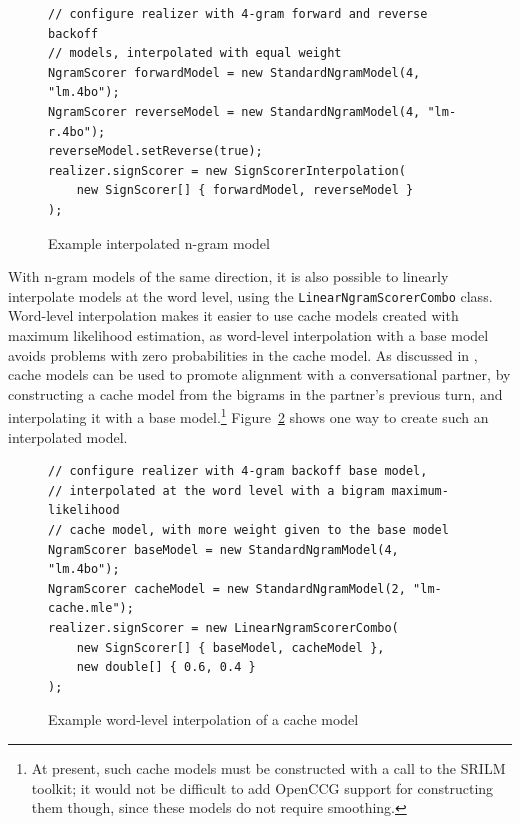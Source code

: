 \documentclass[11pt]{article}
\newcommand{\code}[1]{\texttt{#1}} %
\begin{document}
\begin{figure}%
\begin{center}
\begin{lstlisting}
// configure realizer with 4-gram forward and reverse backoff 
// models, interpolated with equal weight
NgramScorer forwardModel = new StandardNgramModel(4, "lm.4bo"); 
NgramScorer reverseModel = new StandardNgramModel(4, "lm-r.4bo"); 
reverseModel.setReverse(true);
realizer.signScorer = new SignScorerInterpolation(
    new SignScorer[] { forwardModel, reverseModel }
);
\end{lstlisting}
\caption{Example interpolated n-gram model}
\label{forward-reverse-interpolation}
\end{center}
\end{figure}

With n-gram models of the same direction, it is also possible to
linearly interpolate models at the word level, using the
\code{Linear\-Ngram\-Scorer\-Combo} class. Word-level interpolation
makes it easier to use cache models created with maximum likelihood
estimation, as word-level interpolation with a base model avoids
problems with zero probabilities in the cache model. As discussed in
\cite{Carsten-Alignment:2005}, cache models can be used to promote
alignment with a conversational partner, by constructing a cache model
from the bigrams in the partner's previous turn, and interpolating it
with a base model.\footnote{At present, such cache models must be
constructed with a call to the SRILM toolkit; it would not be difficult
to add OpenCCG support for constructing them though, since these models
do not require smoothing.} Figure~\ref{base-cache-interpolation} shows
one way to create such an interpolated model.

\begin{figure}%
\begin{center}
\begin{lstlisting}
// configure realizer with 4-gram backoff base model, 
// interpolated at the word level with a bigram maximum-likelihood 
// cache model, with more weight given to the base model
NgramScorer baseModel = new StandardNgramModel(4, "lm.4bo"); 
NgramScorer cacheModel = new StandardNgramModel(2, "lm-cache.mle"); 
realizer.signScorer = new LinearNgramScorerCombo(
    new SignScorer[] { baseModel, cacheModel }, 
    new double[] { 0.6, 0.4 }
);
\end{lstlisting}
\caption{Example word-level interpolation of a cache model}
\label{base-cache-interpolation}
\end{center}
\end{figure}
\end{document}
